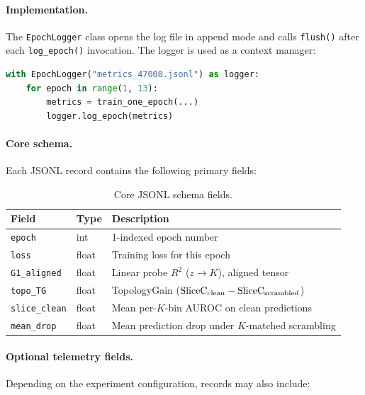 \paragraph{Implementation.} The \texttt{EpochLogger} class opens the log file in append mode and calls \texttt{flush()} after each \texttt{log\_epoch()} invocation. The logger is used as a context manager:

\begin{lstlisting}[language=Python]
with EpochLogger("metrics_47000.jsonl") as logger:
    for epoch in range(1, 13):
        metrics = train_one_epoch(...)
        logger.log_epoch(metrics)
\end{lstlisting}

\paragraph{Core schema.} Each JSONL record contains the following primary fields:

\begin{table}
\caption{Core JSONL schema fields.}
\begin{ruledtabular}
\begin{tabular}{lll}
Field & Type & Description \\
\hline
\texttt{epoch} & int & 1-indexed epoch number \\
\texttt{loss} & float & Training loss for this epoch \\
\texttt{G1\_aligned} & float & Linear probe $R^2$ ($z \to K$), aligned tensor \\
\texttt{topo\_TG} & float & TopologyGain ($\mathrm{SliceC}_{\text{clean}} - \mathrm{SliceC}_{\text{scrambled}}$) \\
\texttt{slice\_clean} & float & Mean per-$K$-bin AUROC on clean predictions \\
\texttt{mean\_drop} & float & Mean prediction drop under $K$-matched scrambling \\
\end{tabular}
\end{ruledtabular}
\end{table}

\paragraph{Optional telemetry fields.} Depending on the experiment configuration, records may also include:

